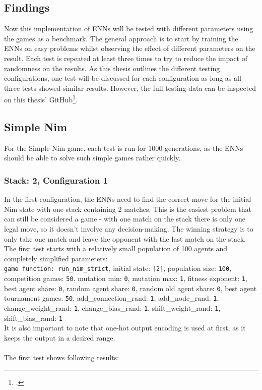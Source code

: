 \documentclass[11pt]{report}
\begin{document}
\begin{enumerate}
    \section{Findings}\label{sec:first-findings}
    Now this implementation of ENNs will be tested with different parameters using the games as a benchmark.
    The general approach is to start by training the ENNs on easy problems whilst observing the effect of different parameters on the result.
    Each test is repeated at least three times to try to reduce the impact of randomness on the results.
    As this thesis outlines the different testing configurations, one test will be discussed for each configuration as long as all three tests showed similar results.
    However, the full testing data can be inspected on this thesis' GitHub\footcite{RustENN}.

    \subsection{Simple Nim}\label{subsec:simple-nim-results}
    For the Simple Nim game, each test is run for 1000 generations, as the ENNs should be able to solve such simple games rather quickly.

    \subsubsection{Stack: 2, Configuration 1}
    In the first configuration, the ENNs need to find the correct move for the initial Nim state with one stack containing 2 matches.
    This is the easiest problem that can still be considered a game - with one match on the stack there is only one legal move, so it doesn't involve any decision-making.
    The winning strategy is to only take one match and leave the opponent with the last match on the stack.
    The first test starts with a relatively small population of 100 agents and completely simplified parameters:
    \\
    \texttt{game function: run\_nim\_strict}, initial state: \texttt{[2]}, population size: \texttt{100}, competition games: \texttt{50}, mutation min: \texttt{0}, mutation max: \texttt{1}, fitness exponent: \texttt{1}, best agent share:
    \texttt{0}, random agent share: \texttt{0}, random old agent share: \texttt{0}, best agent tournament games: \texttt{50}, add\_connection\_rand: \texttt{1}, add\_node\_rand: \texttt{1}, change\_weight\_rand: \texttt{1}, change\_bias\_rand: \texttt{1}, shift\_weight\_rand: \texttt{1}, shift\_bias\_rand: \texttt{1}\\
    It is also important to note that one-hot output encoding is used at first, as it keeps the output in a desired range.
    \\ \\
    The first test shows following results:
    \\
    \newcommand{\csvpath}{../data/simple_nim/stack_2/t_1/stats.csv} %


\end{enumerate}
\end{document}
